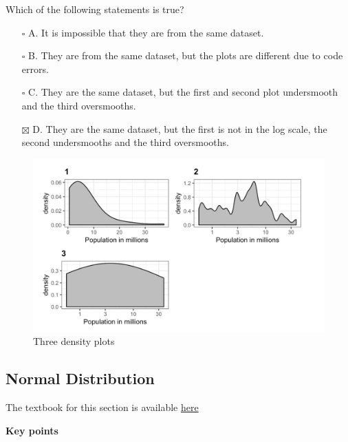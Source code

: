 \documentclass[
]{article}
\providecommand{\tightlist}{%
  \setlength{\itemsep}{0pt}\setlength{\parskip}{0pt}}
\begin{document}
Which of the following statements is true?

\begin{itemize}
\tightlist
\item[$\square$]
  A. It is impossible that they are from the same dataset.
\item[$\square$]
  B. They are from the same dataset, but the plots are different due to
  code errors.
\item[$\square$]
  C. They are the same dataset, but the first and second plot
  undersmooth and the third oversmooths.
\item[$\boxtimes$]
  D. They are the same dataset, but the first is not in the log scale,
  the second undersmooths and the third oversmooths.
\end{itemize}

\begin{figure}
\centering
\includegraphics{images/Three density plots.png}
\caption{Three density plots}
\end{figure}

\hypertarget{normal-distribution}{%
\subsection{Normal Distribution}\label{normal-distribution}}

The textbook for this section is available
\href{https://rafalab.github.io/dsbook/distributions.html\#normal-distribution}{here}

\textbf{Key points}
\end{document}
